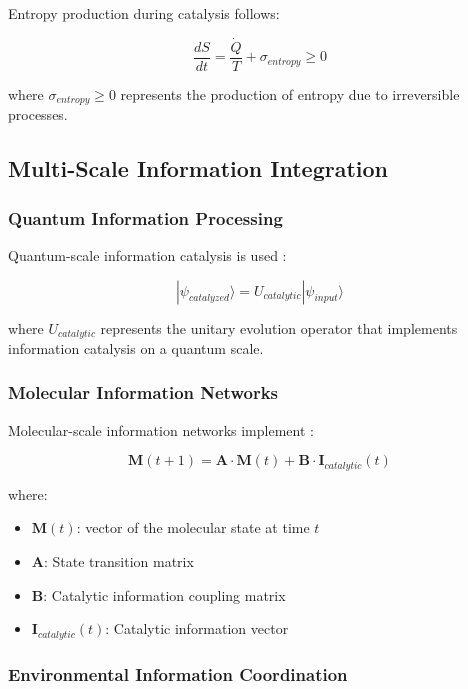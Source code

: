 \documentclass[12pt,a4paper]{article}
\begin{document}
Entropy production during catalysis follows:

\begin{equation}
\frac{dS}{dt} = \frac{\dot{Q}}{T} + \sigma_{entropy} \geq 0
\end{equation}

where $\sigma_{entropy} \geq 0$ represents the production of entropy due to irreversible processes.

\subsection{Multi-Scale Information Integration}

\subsubsection{Quantum Information Processing}

Quantum-scale information catalysis is used \cite{nielsen2010quantum}:

\begin{equation}
|\psi_{catalyzed}\rangle = U_{catalytic} |\psi_{input}\rangle
\end{equation}

where $U_{catalytic}$ represents the unitary evolution operator that implements information catalysis on a quantum scale.

\subsubsection{Molecular Information Networks}

Molecular-scale information networks implement \cite{erdi2005mathematical}:

\begin{equation}
\mathbf{M}(t+1) = \mathbf{A} \cdot \mathbf{M}(t) + \mathbf{B} \cdot \mathbf{I}_{catalytic}(t)
\end{equation}

where:
\begin{itemize}
\item $\mathbf{M}(t)$: vector of the molecular state at time $t$
\item $\mathbf{A}$: State transition matrix
\item $\mathbf{B}$: Catalytic information coupling matrix
\item $\mathbf{I}_{catalytic}(t)$: Catalytic information vector
\end{itemize}

\subsubsection{Environmental Information Coordination}
\end{document}
